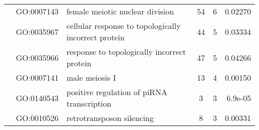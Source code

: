 \begin{landscape}
\begin{longtable}[c]{@{}lllccr@{}}
		                                               & GO:0007143                         & female meiotic nuclear division                                           & 54                                                                 & 6                                                                    & 0.02270                                                                                  \\
		                                               & GO:0035967                         & cellular response to topologically incorrect protein                      & 44                                                                 & 5                                                                    & 0.03334                                                                                  \\
		                                               & GO:0035966                         & response to topologically incorrect protein                               & 47                                                                 & 5                                                                    & 0.04266                                                                                  \\
		                                               & GO:0007141                         & male meiosis I                                                            & 13                                                                 & 4                                                                    & 0.00150                                                                                  \\
		                                               & GO:0140543                         & positive regulation of piRNA transcription                                & 3                                                                  & 3                                                                    & 6.9e-05                                                                                  \\
		                                               & GO:0010526                         & retrotransposon silencing                                                 & 8                                                                  & 3                                                                    & 0.00331                                                                                  \\

\end{longtable}
\end{landscape}
